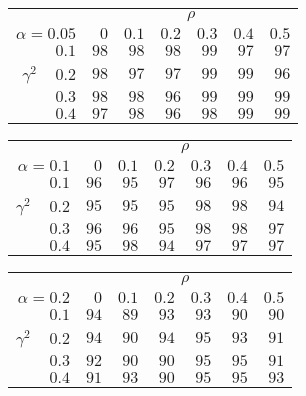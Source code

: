 \begin{tabular}{r|rrrrrr}
\hline\hline
 &\multicolumn{6}{c}{$\rho$} \\ 
 $\alpha = 0.05$ & $0$ & $0.1$ & $0.2$ & $0.3$ & $0.4$ & $0.5$ \\ 
 \hline$0.1$ & $98$ & $98$ & $98$ & $99$ & $97$ & $97$\\ 
$\gamma^2\;\;\;$ $0.2$ & $98$ & $97$ & $97$ & $99$ & $99$ & $96$\\ 
$0.3$ & $98$ & $98$ & $96$ & $99$ & $99$ & $99$\\ 
$0.4$ & $97$ & $98$ & $96$ & $98$ & $99$ & $99$\\ 
 \hline 
 \end{tabular}
 
 \vspace{2em} 
 
\begin{tabular}{r|rrrrrr}
\hline\hline
 &\multicolumn{6}{c}{$\rho$} \\ 
 $\alpha = 0.1$ & $0$ & $0.1$ & $0.2$ & $0.3$ & $0.4$ & $0.5$ \\ 
 \hline$0.1$ & $96$ & $95$ & $97$ & $96$ & $96$ & $95$\\ 
$\gamma^2\;\;\;$ $0.2$ & $95$ & $95$ & $95$ & $98$ & $98$ & $94$\\ 
$0.3$ & $96$ & $96$ & $95$ & $98$ & $98$ & $97$\\ 
$0.4$ & $95$ & $98$ & $94$ & $97$ & $97$ & $97$\\ 
 \hline 
 \end{tabular}
 
 \vspace{2em} 
 
\begin{tabular}{r|rrrrrr}
\hline\hline
 &\multicolumn{6}{c}{$\rho$} \\ 
 $\alpha = 0.2$ & $0$ & $0.1$ & $0.2$ & $0.3$ & $0.4$ & $0.5$ \\ 
 \hline$0.1$ & $94$ & $89$ & $93$ & $93$ & $90$ & $90$\\ 
$\gamma^2\;\;\;$ $0.2$ & $94$ & $90$ & $94$ & $95$ & $93$ & $91$\\ 
$0.3$ & $92$ & $90$ & $90$ & $95$ & $95$ & $91$\\ 
$0.4$ & $91$ & $93$ & $90$ & $95$ & $95$ & $93$\\ 
 \hline 
 \end{tabular}